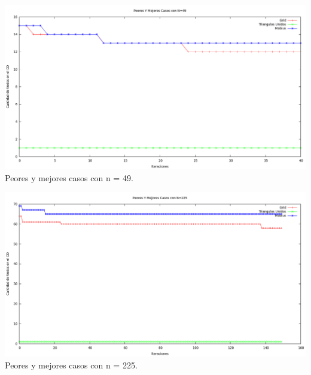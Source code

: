 \begin{center}
\includegraphics[width=17cm]{./graficos/grasp/peoresymejoresn49NUEVO.png}\\
Peores y mejores casos con n = 49.
\end{center}

\begin{center}
\includegraphics[width=17cm]{./graficos/grasp/peoresymejoresn225NUEVO.png}\\
Peores y mejores casos con n = 225.
\end{center}


